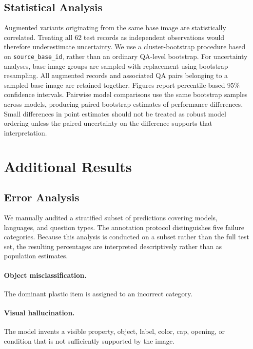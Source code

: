 \documentclass{article}
\begin{document}
\subsection{Statistical Analysis}
\label{subsec:statistics}

Augmented variants originating from the same base image are statistically correlated. Treating all 62 test records as independent observations would therefore underestimate uncertainty. We use a cluster-bootstrap procedure based on \texttt{source\_base\_id}, rather than an ordinary QA-level bootstrap.
For uncertainty analyses, base-image groups are sampled with replacement using bootstrap resampling. All augmented records and associated QA pairs belonging to a sampled base image are retained together. Figures report percentile-based 95\% confidence intervals. Pairwise model comparisons use the same bootstrap samples across models, producing paired bootstrap estimates of performance differences. Small differences in point estimates should not be treated as robust model ordering unless the paired uncertainty on the difference supports that interpretation.
\section{Additional Results}
\subsection{Error Analysis}
\label{subsec:error_analysis}

We manually audited a stratified subset of predictions covering models, languages, and question types. The annotation protocol distinguishes five failure categories. Because this analysis is conducted on a subset rather than the full test set, the resulting percentages are interpreted descriptively rather than as population estimates.

\paragraph{Object misclassification.}
The dominant plastic item is assigned to an incorrect category.

\paragraph{Visual hallucination.}
The model invents a visible property, object, label, color, cap, opening, or condition that is not sufficiently supported by the image.
\end{document}
